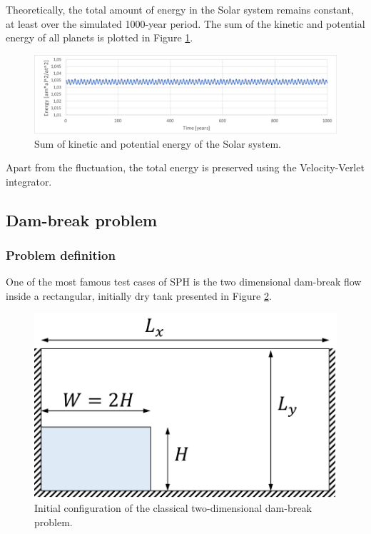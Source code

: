 \documentclass[a4paper,12pt,openany]{book}
\theoremstyle{break}
\begin{document}
Theoretically, the total amount of energy in the Solar system remains constant, at least over the simulated 1000-year period. The sum of the kinetic and potential energy of all planets is plotted in Figure \ref{fig:solar_system_energy}.
\begin{figure}[H]
  \includegraphics[scale=0.5]{solar_system_energy.pdf}
  \centering
  \caption{Sum of kinetic and potential energy of the Solar system. }
  \label{fig:solar_system_energy}
\end{figure}\vspace*{3pt}
Apart from the fluctuation, the total energy is preserved using the Velocity-Verlet integrator.


\subsection{Dam-break problem} \label{Dam-break_problem}
\subsubsection{Problem definition}
One of the most famous test cases of SPH is the two dimensional dam-break flow inside a rectangular, initially dry tank presented in Figure \ref{fig:dambreak_geom}.
\begin{figure}[H]
  \includegraphics[scale=0.6]{dam_break_geom.pdf}
  \centering
  \caption{Initial configuration of the classical two-dimensional dam-break problem.}
  \label{fig:dambreak_geom}
\end{figure}\vspace*{3pt}
\end{document}
